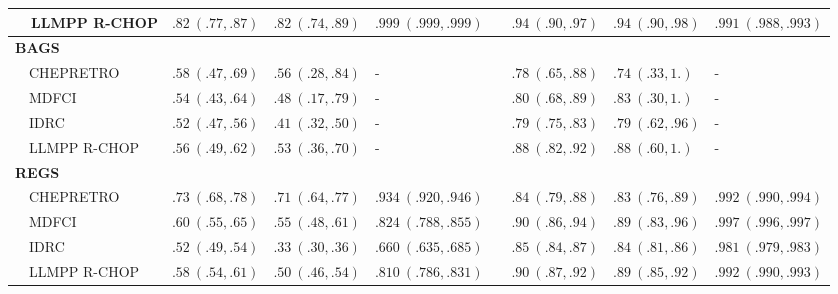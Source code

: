 \begin{table}[!tbp]
\begin{adjustwidth}{-1in}{0in}
{\begin{center}
\begin{tabular}{llllclll}
~~LLMPP R-CHOP&$.82~(.77, .87)$&$.82~(.74, .89)$&$.999~(.999, .999)$&&$.94~(.90, .97)$&$.94~(.90, .98)$&$.991~(.988, .993)$\tabularnewline
\hline
{\bfseries BAGS}&&&&&&&\tabularnewline
~~CHEPRETRO&$.58~(.47, .69)$&$.56~(.28, .84)$&-&&$.78~(.65, .88)$&$.74~(.33, 1.)$&-\tabularnewline
~~MDFCI&$.54~(.43, .64)$&$.48~(.17, .79)$&-&&$.80~(.68, .89)$&$.83~(.30, 1.)$&-\tabularnewline
~~IDRC&$.52~(.47, .56)$&$.41~(.32, .50)$&-&&$.79~(.75, .83)$&$.79~(.62, .96)$&-\tabularnewline
~~LLMPP R-CHOP&$.56~(.49, .62)$&$.53~(.36, .70)$&-&&$.88~(.82, .92)$&$.88~(.60, 1.)$&-\tabularnewline
\hline
{\bfseries REGS}&&&&&&&\tabularnewline
~~CHEPRETRO&$.73~(.68, .78)$&$.71~(.64, .77)$&$.934~(.920, .946)$&&$.84~(.79, .88)$&$.83~(.76, .89)$&$.992~(.990, .994)$\tabularnewline
~~MDFCI&$.60~(.55, .65)$&$.55~(.48, .61)$&$.824~(.788, .855)$&&$.90~(.86, .94)$&$.89~(.83, .96)$&$.997~(.996, .997)$\tabularnewline
~~IDRC&$.52~(.49, .54)$&$.33~(.30, .36)$&$.660~(.635, .685)$&&$.85~(.84, .87)$&$.84~(.81, .86)$&$.981~(.979, .983)$\tabularnewline
~~LLMPP R-CHOP&$.58~(.54, .61)$&$.50~(.46, .54)$&$.810~(.786, .831)$&&$.90~(.87, .92)$&$.89~(.85, .92)$&$.992~(.990, .993)$\tabularnewline
\hline
\end{tabular}\end{center}}
\end{adjustwidth}
\end{table}
